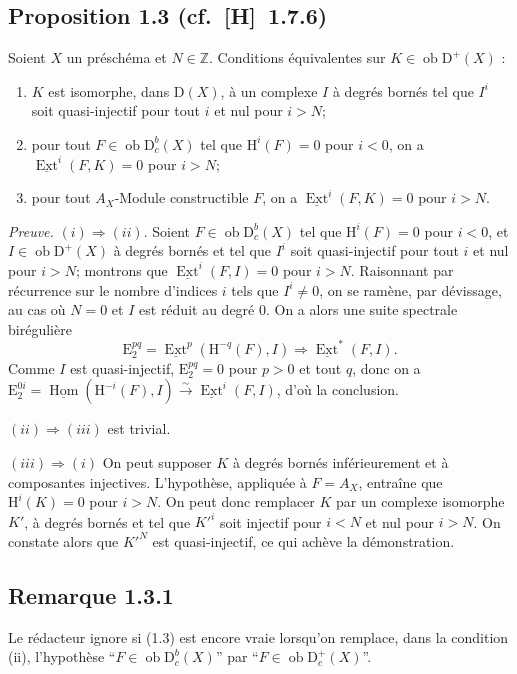 \documentclass[11pt]{article}
\renewcommand{\H}{\mathrm{H}}
\DeclareMathOperator{\Hom}{Hom}
\DeclareMathOperator{\Ext}{Ext}
\newcommand{\D}{\mathrm{D}}
\newcommand{\Z}{\mathbb{Z}}
\newcommand{\E}{\mathrm{E}}
\newcommand{\ob}{\operatorname{ob}}
\providecommand{\Hom}{\operatorname{Hom}}
\providecommand{\ob}{\operatorname{ob}}
\providecommand{\Z}{\mathbb Z}
\providecommand{\Hom}{\operatorname{Hom}}
\begin{document}
\subsection*{Proposition 1.3 {\normalfont (cf.~[H]~1.7.6)}}
Soient $X$ un préschéma et $N \in \Z$. Conditions équivalentes sur $K \in \ob \D^{+}(X)$ :
\begin{enumerate}[label=(\roman*)]
\item $K$ est isomorphe, dans $\D(X)$, à un complexe $I$ à degrés bornés tel que $I^i$ soit quasi-injectif pour tout $i$ et nul pour $i > N$;
\item pour tout $F \in \ob \D_c^{b}(X)$ tel que $\H^i(F) = 0$ pour $i < 0$, on a $\underline{\Ext}^i(F,K) = 0$ pour $i > N$;
\item pour tout $A_X$-Module constructible $F$, on a $\underline{\Ext}^i(F,K) = 0$ pour $i > N$.
\end{enumerate}

\emph{Preuve.} $(i) \Rightarrow (ii)$. Soient $F \in \ob \D_c^{b}(X)$ tel que $\H^i(F) = 0$ pour $i < 0$, et $I \in \ob \D^{+}(X)$ à degrés bornés et tel que $I^i$ soit quasi-injectif pour tout $i$ et nul pour $i > N$; montrons que $\underline{\Ext}^i(F,I) = 0$ pour $i > N$. Raisonnant par récurrence sur le nombre d'indices $i$ tels que $I^i \neq 0$, on se ramène, par dévissage, au cas où $N = 0$ et $I$ est réduit au degré $0$. On a alors une suite spectrale birégulière
\[
\E_2^{pq} = \underline{\Ext}^p(\H^{-q}(F),I) \Rightarrow \underline{\Ext}^{*}(F,I).
\]
Comme $I$ est quasi-injectif, $\E_2^{pq} = 0$ pour $p > 0$ et tout $q$, donc on a $\E_2^{0i} = \underline{\Hom}(\H^{-i}(F),I) \xrightarrow{\sim} \underline{\Ext}^i(F,I)$, d'où la conclusion.

$(ii) \Rightarrow (iii)$ est trivial.

$(iii) \Rightarrow (i)$ On peut supposer $K$ à degrés bornés inférieurement et à composantes injectives. L'hypothèse, appliquée à $F = A_X$, entraîne que $\H^i(K) = 0$ pour $i > N$. On peut donc remplacer $K$ par un complexe isomorphe $K'$, à degrés bornés et tel que $K'^i$ soit injectif pour $i < N$ et nul pour $i > N$. On constate alors que $K'^N$ est quasi-injectif, ce qui achève la démonstration.

\subsection*{Remarque 1.3.1}
Le rédacteur ignore si (1.3) est encore vraie lorsqu'on remplace, dans la condition (ii), l'hypothèse ``$F \in \ob \D_c^{b}(X)$'' par ``$F \in \ob \D_c^{+}(X)$''.
\end{document}
